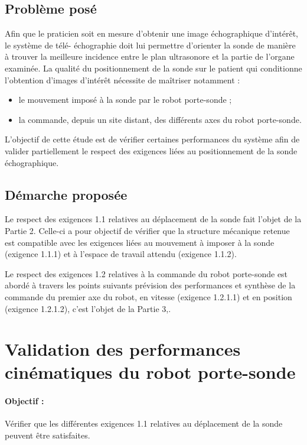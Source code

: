 \subsection{Problème posé}

Afin que le praticien soit en mesure d'obtenir une image échographique d'intérêt, le système de télé- échographie doit lui permettre d'orienter la sonde de manière à trouver la meilleure incidence entre le plan ultrasonore et la partie de l'organe examinée. La qualité du positionnement de la sonde sur le patient qui conditionne l'obtention d'images d'intérêt nécessite de maîtriser notamment : 
\begin{itemize}
 \item le mouvement imposé à la sonde par le robot porte-sonde ;
 \item la commande, depuis un site distant, des différents axes du robot porte-sonde.
\end{itemize}

L'objectif de cette étude est de vérifier certaines performances du système afin de valider partiellement le respect des exigences liées au positionnement de la sonde échographique. 

\subsection{Démarche proposée}

Le respect des exigences 1.1 relatives au déplacement de la sonde fait l'objet de la Partie 2. Celle-ci a pour objectif de vérifier que la structure mécanique retenue est compatible avec les exigences liées au mouvement à imposer à la sonde (exigence 1.1.1) et à l'espace de travail attendu (exigence 1.1.2).

Le respect des exigences 1.2 relatives à la commande du robot porte-sonde est abordé à travers les points suivants prévision des performances et synthèse de la commande du premier axe du robot, en vitesse (exigence 1.2.1.1) et en position (exigence 1.2.1.2), c'est l'objet de la Partie 3,. 

\section{Validation des performances cinématiques du robot porte-sonde}

\paragraph{Objectif :} Vérifier que les différentes exigences 1.1 relatives au déplacement de la sonde peuvent être satisfaites. 


